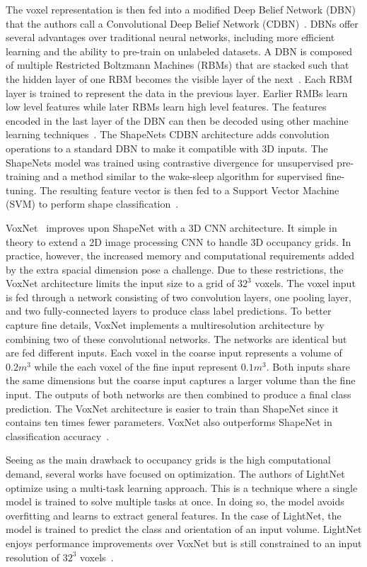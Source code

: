 The voxel representation is then fed into a modified Deep Belief Network (DBN) that the authors call a Convolutional Deep Belief Network (CDBN)~\cite{Wu2015}. DBNs offer several advantages over traditional neural networks, including more efficient learning and the ability to pre-train on unlabeled datasets. A DBN is composed of multiple Restricted Boltzmann Machines (RBMs) that are stacked such that the hidden layer of one RBM becomes the visible layer of the next~\cite{Aljabery2020}. Each RBM layer is trained to represent the data in the previous layer. Earlier RMBs learn low level features while later RBMs learn high level features. The features encoded in the last layer of the DBN can then be decoded using other machine learning techniques~\cite{McAfee2008}. The ShapeNets CDBN architecture adds convolution operations to a standard DBN to make it compatible with 3D inputs. The ShapeNets model was trained using contrastive divergence for unsupervised pre-training and a method similar to the wake-sleep algorithm for supervised fine-tuning. The resulting feature vector is then fed to a Support Vector Machine (SVM) to perform shape classification~\cite{Wu2015}.

VoxNet~\cite{Maturana2015} improves upon ShapeNet with a 3D CNN architecture. It simple in theory to extend a 2D image processing CNN to handle 3D occupancy grids. In practice, however, the increased memory and computational requirements added by the extra spacial dimension pose a challenge. Due to these restrictions, the VoxNet architecture limits the input size to a grid of $32^3$ voxels. The voxel input is fed through a network consisting of two convolution layers, one pooling layer, and two fully-connected layers to produce class label predictions. To better capture fine details, VoxNet implements a multiresolution architecture by combining two of these convolutional networks. The networks are identical but are fed different inputs. Each voxel in the coarse input represents a volume of $0.2m^3$ while the each voxel of the fine input represent $0.1m^3$. Both inputs share the same dimensions but the coarse input captures a larger volume than the fine input. The outputs of both networks are then combined to produce a final class prediction. The VoxNet architecture is easier to train than ShapeNet since it contains ten times fewer parameters. VoxNet also outperforms ShapeNet in classification accuracy~\cite{Maturana2015}.

Seeing as the main drawback to occupancy grids is the high computational demand, several works have focused on optimization. The authors of LightNet~\cite{Ye2016} optimize using a multi-task learning approach. This is a technique where a single model is trained to solve multiple tasks at once. In doing so, the model avoids overfitting and learns to extract general features. In the case of LightNet, the model is trained to predict the class and orientation of an input volume. LightNet enjoys performance improvements over VoxNet but is still constrained to an input resolution of $32^3$ voxels~\cite{Ye2016}. 

